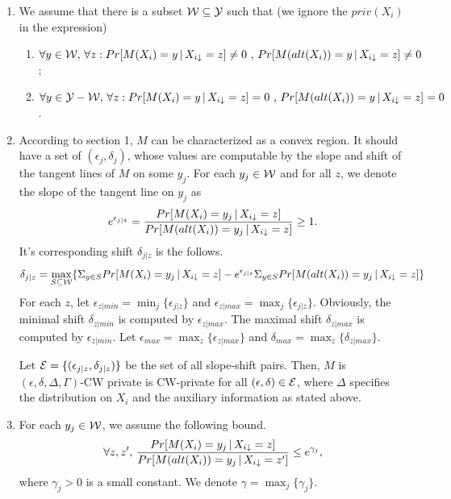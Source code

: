 \documentclass[11pt]{article}
\begin{document}
\begin{enumerate}
\item We assume that there is a subset ${\cal W} \subseteq {\cal Y}$ such that (we ignore the $priv(X_{i})$ in the expression)
\begin{enumerate}
\item $\forall y \in {\cal W},\, \forall z: Pr[M(X_{i})=y\,|\,X_{i \downarrow}=z] \neq 0 \text{ , }Pr[M(alt(X_{i}))=y\,|\,X_{i \downarrow}=z] \neq 0$ ;
\item $\forall y \in {\cal Y-W},\, \forall z: Pr[M(X_{i})=y\,|\,X_{i \downarrow}=z] = 0 \text{ , }Pr[M(alt(X_{i}))=y\,|\,X_{i \downarrow}=z] = 0$ .
\end{enumerate}
\item According to section 1, $M$ can be characterized as a convex region. It should have a set of $(\epsilon_{j}, \delta_{j})$, whose values are computable by the slope and shift of the tangent lines of $M$ on some $y_{j}$. For each $y_{j} \in {\cal W}$ and for all $z$, we denote the slope of the tangent line on $y_{j}$ as 
\begin{equation}
 e^{\epsilon_{j|z}} = \frac{Pr[M(X_{i})=y_{j}\,|\,X_{i \downarrow}=z] }{Pr[M(alt(X_{i}))=y_{j}\,|\,X_{i \downarrow}=z] } \geq  1.
\end{equation}
It's corresponding shift $\delta_{j|z}$ is the follows.
\begin{equation}
\delta_{j|z} =\max_{S \subseteq {\cal W}} \{ \Sigma_{y \in S}Pr[M(X_{i})=y_{j}\,|\,X_{i \downarrow}=z] - e^{\epsilon_{j|z}}\Sigma_{y \in S}Pr[M(alt(X_{i}))=y_{j}\,|\,X_{i \downarrow}=z]\} 
\end{equation} 
For each $z$, let $\epsilon_{z|min} = \min_{j} \{\epsilon_{j|z} \}$ and $\epsilon_{z|max}= \max_{j} \{\epsilon_{j|z} \}$. Obviously, the minimal shift $\delta_{z|min} $ is computed by $\epsilon_{z|max}$. The maximal shift $\delta_{z|max} $ is computed by $\epsilon_{z|min}$. Let $\epsilon_{max} = \max_{z} \{\epsilon_{z|max}\}$ and $\delta_{max} = \max_{z} \{\delta_{z|max}\}$.

Let ${\cal E} = \{(\epsilon_{j|z}, \delta_{j|z})\}$ be the set of all slope-shift pairs. Then, $M$ is $(\epsilon, \delta, \Delta, \Gamma)$-CW private is  CW-private for all $(\epsilon, \delta) \in {\cal E}$, where $\Delta$ specifies the distribution on $X_{i}$ and the auxiliary information as stated above.
\item For each $y_{j} \in {\cal W}$, we assume the following bound.
\begin{equation}
\forall z, z', \, \frac{Pr[M(X_{i})=y_{j}\,|\,X_{i \downarrow}=z] }{Pr[M(alt(X_{i}))=y_{j}\,|\,X_{i \downarrow}=z'] } \leq e^{\gamma_{j}},
\end{equation}
where $\gamma_{j}>0$ is a small constant. We denote $\gamma = \max_{j} \{\gamma_{j}\}$.
\end{enumerate}
\end{document}
